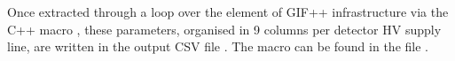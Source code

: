	Once extracted through a loop over the element of GIF++ infrastructure via the C++ macro , these parameters, organised in 9 columns per detector HV supply line, are written in the output CSV file . The macro can be found in the file .
